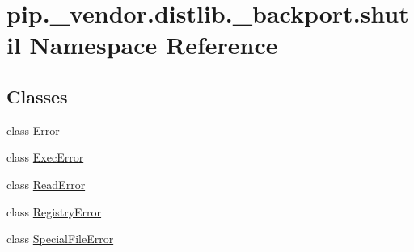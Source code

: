 \hypertarget{namespacepip_1_1__vendor_1_1distlib_1_1__backport_1_1shutil}{}\section{pip.\+\_\+vendor.\+distlib.\+\_\+backport.\+shutil Namespace Reference}
\label{namespacepip_1_1__vendor_1_1distlib_1_1__backport_1_1shutil}
\subsection*{Classes}
\begin{DoxyCompactItemize}
\item 
class \hyperlink{classpip_1_1__vendor_1_1distlib_1_1__backport_1_1shutil_1_1Error}{Error}
\item 
class \hyperlink{classpip_1_1__vendor_1_1distlib_1_1__backport_1_1shutil_1_1ExecError}{Exec\+Error}
\item 
class \hyperlink{classpip_1_1__vendor_1_1distlib_1_1__backport_1_1shutil_1_1ReadError}{Read\+Error}
\item 
class \hyperlink{classpip_1_1__vendor_1_1distlib_1_1__backport_1_1shutil_1_1RegistryError}{Registry\+Error}
\item 
class \hyperlink{classpip_1_1__vendor_1_1distlib_1_1__backport_1_1shutil_1_1SpecialFileError}{Special\+File\+Error}
\end{DoxyCompactItemize}
